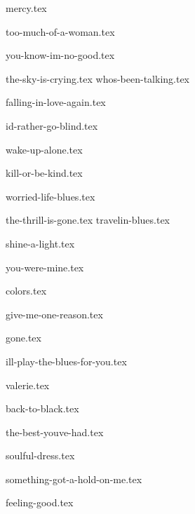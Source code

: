\begin{songs}{}

  {mercy.tex}
  \sclearpage

  {too-much-of-a-woman.tex}
  \sclearpage

  {you-know-im-no-good.tex}
  \sclearpage

  {the-sky-is-crying.tex}
  {whos-been-talking.tex}

  \sclearpage

  {falling-in-love-again.tex}  
  \sclearpage

  {id-rather-go-blind.tex}  
  \sclearpage
  
  {wake-up-alone.tex}
  \sclearpage
  
  {kill-or-be-kind.tex}
  \sclearpage
  
  {worried-life-blues.tex}
  \sclearpage

  {the-thrill-is-gone.tex}
  {travelin-blues.tex}

  \sclearpage

  {shine-a-light.tex}  
  \sclearpage

  {you-were-mine.tex}
  \sclearpage

  {colors.tex}
  \sclearpage

  {give-me-one-reason.tex}
  \sclearpage

  {gone.tex}
  \sclearpage

  {ill-play-the-blues-for-you.tex}
  \sclearpage
    
  {valerie.tex}
  \sclearpage

  {back-to-black.tex}
  \sclearpage
  
  {the-best-youve-had.tex}
  \sclearpage
  
  {soulful-dress.tex}
  \sclearpage
    
  {something-got-a-hold-on-me.tex}
  \sclearpage

  {feeling-good.tex}
  \sclearpage
    

\end{songs}
